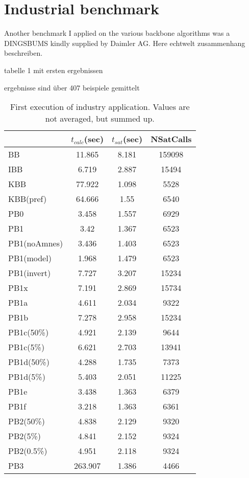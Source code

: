 \section{Industrial benchmark}

Another benchmark I applied on the various backbone algorithms was a DINGSBUMS kindly supplied by Daimler AG. Here echtwelt zusammenhang beschreiben.



tabelle 1 mit ersten ergebnissen

ergebnisse sind über 407 beispiele gemittelt

\begin{wraptable}{r}{8cm} %
\label{tab:vonThore1} %
\begin{tabular}{l| c c c }
&	$t_{calc}$(sec) &	$t_{sat}$(sec)	& NSatCalls \\
\hline
BB & 11.865 & 8.181 & 159098 \\
IBB & 6.719 & 2.887 & 15494 \\
KBB & 77.922 & 1.098 & 5528 \\
KBB(pref) & 64.666 & 1.55 & 6540 \\
PB0 & 3.458 & 1.557 & 6929 \\
PB1 & 3.42 & 1.367 & 6523 \\
PB1(noAmnes) & 3.436 & 1.403 & 6523 \\
PB1(model) & 1.968 & 1.479 & 6523 \\
PB1(invert) & 7.727 & 3.207 & 15234 \\
PB1x & 7.191 & 2.869 & 15734 \\
PB1a & 4.611 & 2.034 & 9322 \\
PB1b & 7.278 & 2.958 & 15234 \\
PB1c(50\%) & 4.921 & 2.139 & 9644 \\
PB1c(5\%) & 6.621 & 2.703 & 13941 \\
PB1d(50\%) & 4.288 & 1.735 & 7373 \\
PB1d(5\%) & 5.403 & 2.051 & 11225 \\
PB1e & 3.438 & 1.363 & 6379 \\
PB1f & 3.218 & 1.363 & 6361 \\
PB2(50\%) & 4.838 & 2.129 & 9320 \\
PB2(5\%) & 4.841 & 2.152 & 9324 \\
PB2(0.5\%) & 4.951 & 2.118 & 9324 \\
PB3 & 263.907 & 1.386 & 4466 \\
\end{tabular}
\caption{First execution of industry application. Values are not averaged, but summed up.}
\end{wraptable}

